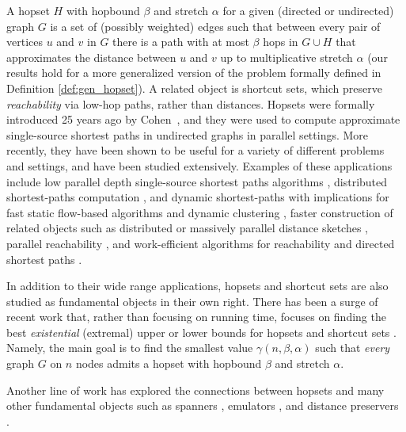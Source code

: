 \documentclass{article}
\theoremstyle{definition}
\theoremstyle{remark}
\begin{document}
A hopset $H$ with hopbound $\beta$ and stretch $\alpha$ for a given (directed or undirected) graph $G$ is a set of (possibly weighted) edges such that between every pair of vertices $u$ and $v$ in $G$ there is a path with at most $\beta$ hops in $G \cup H$ that approximates the distance between $u$ and $v$ up to multiplicative stretch $\alpha$ (our results hold for a more generalized version of the problem formally defined in Definition \ref{def:gen_hopset}). A related object is shortcut sets, which preserve \emph{reachability} via low-hop paths, rather than distances.
Hopsets were formally introduced 25 years ago by Cohen~\cite{cohen2000}, and they were used to compute approximate single-source shortest paths in undirected graphs in parallel settings.  More recently, they have been shown to be useful for a variety of different problems and settings, and have been studied extensively.  Examples of these applications include low parallel depth single-source shortest paths algorithms \cite{klein1997, cohen2000, miller2015, elkin2019RNC}, distributed shortest-paths computation \cite{elkin2019journal, elkin2017, censor2021}, and dynamic shortest-paths \cite{bernstein2011,henzinger2014, gutenberg2020, chechik2018, LN2022} with implications for fast static flow-based algorithms \cite{madry2010, bernstein2021deterministic, chen2022maximum} and dynamic clustering \cite{cruciani2024dynamic}, faster construction of related objects such as distributed or massively parallel distance sketches \cite{elkin2017, dinitz2019, DM24}, parallel reachability \cite{ullman1990high}, and work-efficient algorithms for reachability and directed shortest paths \cite{cao2020efficient, cao2020improved, cao2023exact,fineman2018nearly,jambulapati2019parallel}.


In addition to their wide range applications, hopsets and shortcut sets are also studied as fundamental objects in their own right. There has been a surge of recent work that, rather than focusing on running time, focuses on finding the best \emph{existential} (extremal) upper or lower bounds for hopsets and shortcut sets \cite{KP22,BW23, hesse2003directed, huang2021lower, kogan2023towards,  williams2024simpler}. 
Namely, the main goal is to find the smallest value $\gamma(n,\beta, \alpha)$ such that \emph{every} graph $G$ on $n$ nodes admits a hopset with hopbound $\beta$ and stretch $\alpha$.

Another line of work has explored the connections between hopsets and many other fundamental objects such as spanners \cite{BP2020, abboud2018}, emulators \cite{elkin2020survey, huang2019}, and distance preservers \cite{KP2022hope, hoppenworth2025, bodwin2023bridge}.
\end{document}
